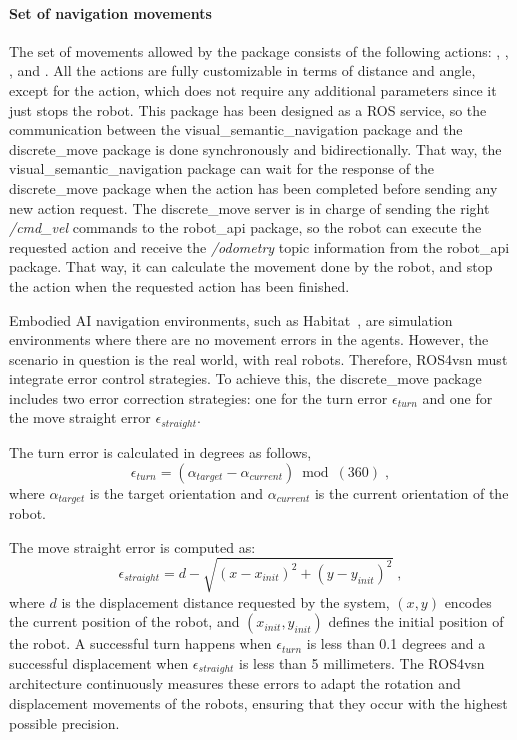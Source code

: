 \paragraph*{\textbf{Set of navigation movements}}\label{par:movement-set}

The set of movements allowed by the package consists of the following actions: \turnleft, \turnright, \moveforward, \movebackward and \stopac.
All the actions are fully customizable in terms of distance and angle, except for the \stopac action, which does not require any additional parameters since it just stops the robot.
This package has been designed as a ROS service, so the communication between the visual\_semantic\_navigation package and the discrete\_move package is done synchronously and bidirectionally.
That way, the visual\_semantic\_navigation package can wait for the response of the discrete\_move package when the action has been completed before sending any new action request.
The discrete\_move server is in charge of sending the right \textit{/cmd\_vel} commands to the robot\_api package, so the robot can execute the requested action and receive the \textit{/odometry} topic information from the robot\_api package.
That way, it can calculate the movement done by the robot, and stop the action when the requested action has been finished.

Embodied AI navigation environments, such as Habitat~\cite{NEURIPS2021_021bbc7e}, are simulation environments where there are no movement errors in the agents.
However, the scenario in question is the real world, with real robots.
Therefore, ROS4\acrshort{vsn} must integrate error control strategies.
To achieve this, the discrete\_move package includes two error correction strategies: one for the turn error $\epsilon_{turn}$ and one for the move straight error $\epsilon_{straight}$.

The turn error is calculated in degrees as follows,
\begin{equation}
    \label{eq:turn_error}
    \epsilon_{turn} = (\alpha_{target}- \alpha_{current}) \bmod(360)\; ,
\end{equation}
where $\alpha_{target}$ is the target orientation and $\alpha_{current}$ is the current orientation of the robot.

The move straight error is computed as:
\begin{equation}
    \label{eq:error_move}
    \epsilon_{straight} = {d - \sqrt{(x-x_{init})^2+(y-y_{init})^2}}\; ,
\end{equation}
where $d$ is the displacement distance requested by the system, $(x,y)$ encodes the current position of the robot, and $(x_{init},y_{init})$ defines the initial position of the robot.
A successful turn happens when $\epsilon_{turn}$ is less than 0.1 degrees and a successful displacement when $\epsilon_{straight}$ is less than 5 millimeters.
The ROS4\acrshort{vsn} architecture continuously measures these errors to adapt the rotation and displacement movements of the robots, ensuring that they occur with the highest possible precision.

